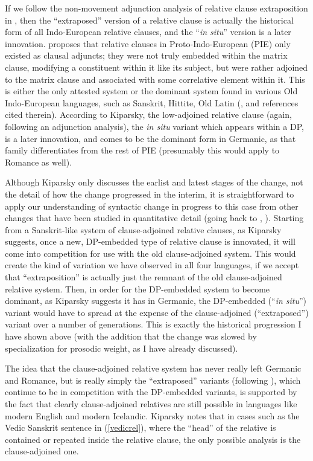 If we follow the non-movement adjunction analysis of relative clause extraposition in \citet{culicoverrochemont1990}, then the ``extraposed'' version of a relative clause is actually the historical form of all Indo-European relative clauses, and the ``\textsl{in situ}'' version is a later innovation. \citet{kiparsky1995} proposes that relative clauses in Proto-Indo-European (PIE) only existed as clausal adjuncts; they were not truly embedded within the matrix clause, modifying a constituent within it like its subject, but were rather adjoined to the matrix clause and associated with some correlative element within it. This is either the only attested system or the dominant system found in various Old Indo-European languages, such as Sanskrit, Hittite, Old Latin (\citealt[][155]{kiparsky1995}, and references cited therein). According to Kiparsky, the low-adjoined relative clause (again, following an adjunction analysis), the \textsl{in situ} variant which appears within a DP, is a later innovation, and comes to be the dominant form in Germanic, as that family differentiates from the rest of PIE (presumably this would apply to Romance as well).

Although Kiparsky only discusses the earlist and latest stages of the change, not the detail of how the change progressed in the interim, it is straightforward to apply our understanding of syntactic change in progress to this case from other changes that have been studied in quantitative detail (going back to \citealt{kroch1989}, \citealt{santorini1989}). Starting from a Sanskrit-like system of clause-adjoined relative clauses, as Kiparsky suggests, once a new, DP-embedded type of relative clause is innovated, it will come into competition for use with the old clause-adjoined system. This would create the kind of variation we have observed in all four languages, if we accept that ``extraposition'' is actually just the remnant of the old clause-adjoined relative system. Then, in order for the DP-embedded system to become dominant, as Kiparsky suggests it has in Germanic, the DP-embedded (``\textsl{in situ}'') variant would have to spread at the expense of the clause-adjoined (``extraposed'') variant over a number of generations. This is exactly the historical progression I have shown above (with the addition that the change was slowed by specialization for prosodic weight, as I have already discussed).

The idea that the clause-adjoined relative system has never really left Germanic and Romance, but is really simply the ``extraposed'' variants (following \citealt{culicoverrochemont1990}), which continue to be in competition with the DP-embedded variants, is supported by the fact that clearly clause-adjoined relatives are still possible in languages like modern English and modern Icelandic. Kiparsky notes that in cases such as the Vedic Sanskrit sentence in (\ref{vedicrel}), where the ``head'' of the relative is contained or repeated inside the relative clause, the only possible analysis is the clause-adjoined one.

